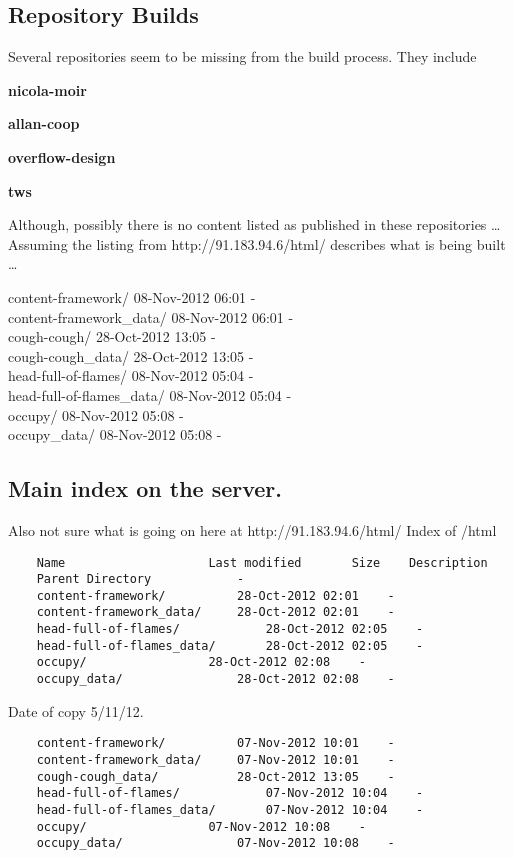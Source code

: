\documentclass[12pt]{article}
\begin{document}
\subsection{Repository Builds}

Several repositories seem to be missing from the build process. They include
\begin{description} 
\item {\bf nicola-moir}
\item {\bf allan-coop}
\item {\bf overflow-design}
\item{\bf  tws}
\end{description}
Although, possibly there is no content listed as published in these repositories \ldots\\
Assuming the listing from http://91.183.94.6/html/ describes what is being built \ldots

\noindent	content-framework/	08-Nov-2012 06:01	 -	\\ 
	content-framework\_data/	08-Nov-2012 06:01	 -	 \\
	cough-cough/	28-Oct-2012 13:05	 -	 \\
	cough-cough\_data/	28-Oct-2012 13:05	 -	\\ 
	head-full-of-flames/	08-Nov-2012 05:04	 -	 \\
	head-full-of-flames\_data/	08-Nov-2012 05:04	 -	 \\
	occupy/	08-Nov-2012 05:08	 -	 \\
	occupy\_data/	08-Nov-2012 05:08	 -	\\


\subsection{Main index on the server.}

Also not sure what is going on here at http://91.183.94.6/html/
Index of /html

\begin{verbatim}
	Name					Last modified		Size	Description
	Parent Directory	 	 	-	 
	content-framework/			28-Oct-2012 02:01	 -	 
	content-framework_data/		28-Oct-2012 02:01	 -	 
	head-full-of-flames/			28-Oct-2012 02:05	 -	 
	head-full-of-flames_data/		28-Oct-2012 02:05	 -	 
	occupy/					28-Oct-2012 02:08	 -	 
	occupy_data/				28-Oct-2012 02:08	 -	 
\end{verbatim}
Date of copy 5/11/12.
\begin{verbatim}
	content-framework/			07-Nov-2012 10:01	 -	 
	content-framework_data/		07-Nov-2012 10:01	 -	 
	cough-cough_data/			28-Oct-2012 13:05	 -	 
	head-full-of-flames/			07-Nov-2012 10:04	 -	 
	head-full-of-flames_data/		07-Nov-2012 10:04	 -	 
	occupy/					07-Nov-2012 10:08	 -	 
	occupy_data/				07-Nov-2012 10:08	 -	 
\end{verbatim}
\end{document}
